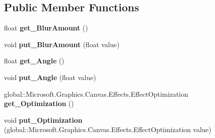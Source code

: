 \subsection*{Public Member Functions}
\begin{DoxyCompactItemize}
\item 
\mbox{\label{interface_microsoft_1_1_graphics_1_1_canvas_1_1_effects_1_1_i_directional_blur_effect_a4678a1fcff40d964531dcc8bec2c2623}} 
float {\bfseries get\+\_\+\+Blur\+Amount} ()
\item 
\mbox{\label{interface_microsoft_1_1_graphics_1_1_canvas_1_1_effects_1_1_i_directional_blur_effect_ab5a1c0e6691e6caf3350123e055c9cc2}} 
void {\bfseries put\+\_\+\+Blur\+Amount} (float value)
\item 
\mbox{\label{interface_microsoft_1_1_graphics_1_1_canvas_1_1_effects_1_1_i_directional_blur_effect_ad5925e9f76f210acd008a4877fb9e527}} 
float {\bfseries get\+\_\+\+Angle} ()
\item 
\mbox{\label{interface_microsoft_1_1_graphics_1_1_canvas_1_1_effects_1_1_i_directional_blur_effect_a7e8558ed00f4de1768f22d9edc7463be}} 
void {\bfseries put\+\_\+\+Angle} (float value)
\item 
\mbox{\label{interface_microsoft_1_1_graphics_1_1_canvas_1_1_effects_1_1_i_directional_blur_effect_aac219bc783a9db2269f2a420ca5e332c}} 
global\+::\+Microsoft.\+Graphics.\+Canvas.\+Effects.\+Effect\+Optimization {\bfseries get\+\_\+\+Optimization} ()
\item 
\mbox{\label{interface_microsoft_1_1_graphics_1_1_canvas_1_1_effects_1_1_i_directional_blur_effect_af3c7a1c1a75107541138dc590902c805}} 
void {\bfseries put\+\_\+\+Optimization} (global\+::\+Microsoft.\+Graphics.\+Canvas.\+Effects.\+Effect\+Optimization value)
\item 

\end{DoxyCompactItemize}
